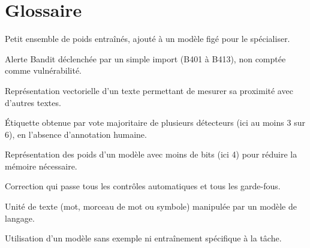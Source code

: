 \documentclass[11pt,a4paper,oneside]{report}
\begin{document}
\appendix
\renewcommand{\chaptername}{Annexe}

\chapter{Glossaire}
\begin{description}[style=nextline,leftmargin=0.6cm]
  \item[Adaptateur LoRA] Petit ensemble de poids entraînés, ajouté à un modèle figé pour le spécialiser.
  \item[Alerte informative] Alerte Bandit déclenchée par un simple import (B401 à B413), non comptée comme vulnérabilité.
  \item[Embedding] Représentation vectorielle d'un texte permettant de mesurer sa proximité avec d'autres textes.
  \item[Pseudo-vérité] Étiquette obtenue par vote majoritaire de plusieurs détecteurs (ici au moins 3 sur 6), en l'absence d'annotation humaine.
  \item[Quantification] Représentation des poids d'un modèle avec moins de bits (ici 4) pour réduire la mémoire nécessaire.
  \item[Succès strict] Correction qui passe tous les contrôles automatiques et tous les garde-fous.
  \item[Token] Unité de texte (mot, morceau de mot ou symbole) manipulée par un modèle de langage.
  \item[Zero-shot] Utilisation d'un modèle sans exemple ni entraînement spécifique à la tâche.
\end{description}
\end{document}
